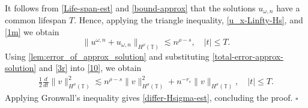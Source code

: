 \documentclass[12pt,reqno]{amsart}
\renewcommand{\qedsymbol}{\ensuremath{\square}}
\newcommand{\ci}{\mathbb{T}}
\theoremstyle{plain}  %
\theoremstyle{definition}
\begin{document}
%
%
It follows from \eqref{Life-span-est} and 
\eqref{bound-approx} that the solutions $u_{\omega,n}$ have a common 
lifespan $T$. Hence, applying the triangle inequality, 
\eqref{u_x-Linfty-Hs}, and \eqref{1m} we obtain  
%
%
\begin{equation}
	\|u^{\omega,n} + u_{\omega,n}\|_{H^\rho(\ci)} \lesssim n^{\rho -s}, 
	\quad |t| \le T.
\label{3r}
\end{equation}
%
%
%
%
%
%
Using \autoref{lem:error_of_approx_solution} and
substituting \eqref{total-error-approx-solution} and \eqref{3r}
into \eqref{10}, we obtain
%
%
\begin{equation}
\begin{split}
\frac{1}{2}\frac{d}{dt}\|v\|_{H^\sigma(\ci)}^2 \lesssim n^{\rho - s}
\|v\|_{H^\sigma(\ci)}^2 + n^{-r_s}\|v\|_{H^\sigma(\ci)}, \quad |t| \le T.
\label{200r}
\end{split}
\end{equation}
%
%
Applying Gronwall's inequality gives \eqref{differ-Hsigma-est}, concluding 
the proof. \qquad \qedsymbol
%
%
%
%
%
%
%
\end{document}
